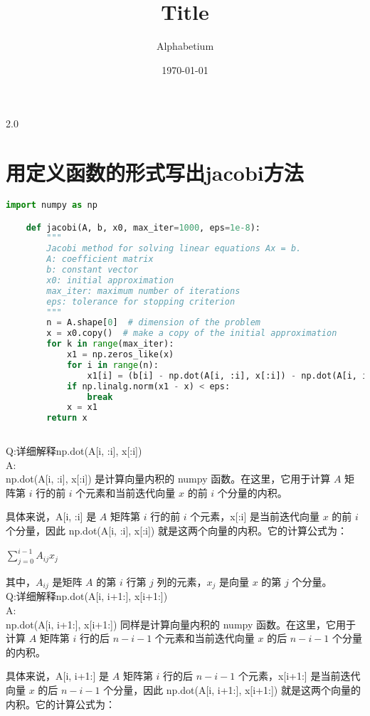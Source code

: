 \documentclass[12pt, a4paper, oneside]{article}
\title{Title}
\date{\today}
\author{Alphabetium}
\begin{document}
\begin{spacing}{2.0}
\maketitle


\section{用定义函数的形式写出jacobi方法}

\begin{lstlisting}[language=Python, caption=0.1s]
    import numpy as np

    def jacobi(A, b, x0, max_iter=1000, eps=1e-8):
        """
        Jacobi method for solving linear equations Ax = b.
        A: coefficient matrix
        b: constant vector
        x0: initial approximation
        max_iter: maximum number of iterations
        eps: tolerance for stopping criterion
        """
        n = A.shape[0]  # dimension of the problem
        x = x0.copy()  # make a copy of the initial approximation
        for k in range(max_iter):
            x1 = np.zeros_like(x)
            for i in range(n):
                x1[i] = (b[i] - np.dot(A[i, :i], x[:i]) - np.dot(A[i, i+1:], x[i+1:])) / A[i, i]
            if np.linalg.norm(x1 - x) < eps:
                break
            x = x1
        return x
    
\end{lstlisting}
Q:详细解释np.dot(A[i, :i], x[:i])\\
A:\\
np.dot(A[i, :i], x[:i]) 是计算向量内积的 numpy 函数。在这里，它用于计算 $A$ 矩阵第 $i$ 行的前 $i$ 个元素和当前迭代向量 $x$ 的前 $i$ 个分量的内积。

具体来说，A[i, :i] 是 $A$ 矩阵第 $i$ 行的前 $i$ 个元素，x[:i] 是当前迭代向量 $x$ 的前 $i$ 个分量，因此 np.dot(A[i, :i], x[:i]) 就是这两个向量的内积。它的计算公式为：

$\sum_{j=0}^{i-1} A_{ij} x_j$

其中，$A_{ij}$ 是矩阵 $A$ 的第 $i$ 行第 $j$ 列的元素，$x_j$ 是向量 $x$ 的第 $j$ 个分量。\\

Q:详细解释np.dot(A[i, i+1:], x[i+1:])\\
A:\\
np.dot(A[i, i+1:], x[i+1:]) 同样是计算向量内积的 numpy 函数。在这里，它用于计算 $A$ 矩阵第 $i$ 行的后 $n-i-1$ 个元素和当前迭代向量 $x$ 的后 $n-i-1$ 个分量的内积。

具体来说，A[i, i+1:] 是 $A$ 矩阵第 $i$ 行的后 $n-i-1$ 个元素，x[i+1:] 是当前迭代向量 $x$ 的后 $n-i-1$ 个分量，因此 np.dot(A[i, i+1:], x[i+1:]) 就是这两个向量的内积。它的计算公式为：


\end{spacing}
\end{document}
